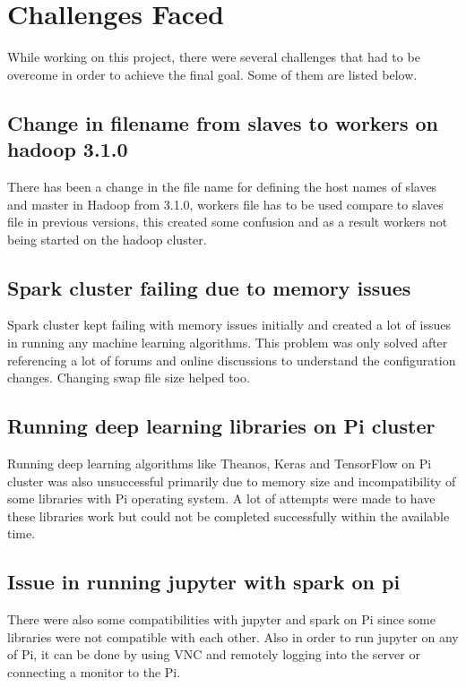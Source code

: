 \section{Challenges Faced}

While working on this project, there were several challenges that had
to be overcome in order to achieve the final goal. Some of them are 
listed below. 

\subsection{Change in filename from slaves to workers on hadoop 3.1.0}

There has been a change in the file name for defining the host names
of slaves and master in Hadoop from 3.1.0, workers file has to be used
compare to slaves file in previous versions, this created some
confusion and as a result workers not being started on the hadoop
cluster.

\subsection{Spark cluster failing due to memory issues}

Spark cluster kept failing with memory issues initially and created a
lot of issues in running any machine learning algorithms. This problem
was only solved after referencing a lot of forums and online
discussions to understand the configuration changes. Changing swap
file size helped too.

\subsection{Running deep learning libraries on Pi cluster}

Running deep learning algorithms like Theanos, Keras and TensorFlow on
Pi cluster was also unsuccessful primarily due to memory size and
incompatibility of some libraries with Pi operating system. A lot of
attempts were made to have these libraries work but could not be
completed successfully within the available time.

\subsection{Issue in running jupyter with spark on pi}

There were also some compatibilities with jupyter and spark on Pi
since some libraries were not compatible with each other. Also in
order to run jupyter on any of Pi, it can be done by using VNC and
remotely logging into the server or connecting a monitor to the Pi.

